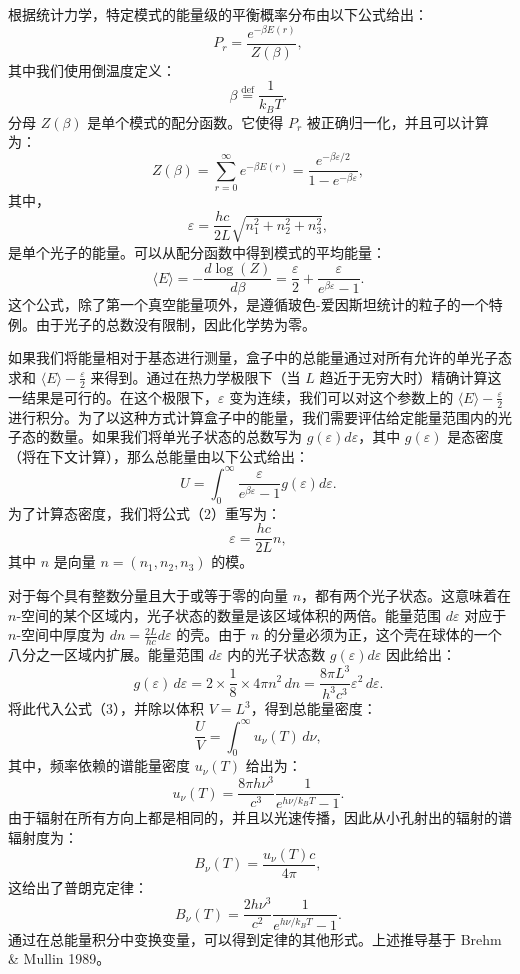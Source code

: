 根据统计力学，特定模式的能量级的平衡概率分布由以下公式给出：
\[
P_r = \frac{e^{-\beta E(r)}}{Z(\beta)},~
\]
其中我们使用倒温度定义：
\[
\beta \stackrel{\mathrm{def}}{=} \frac{1}{k_B T}.~
\]
分母 \( Z(\beta) \) 是单个模式的配分函数。它使得 \( P_r \) 被正确归一化，并且可以计算为：
\[
Z(\beta) = \sum_{r=0}^{\infty} e^{-\beta E(r)} = \frac{e^{-\beta \varepsilon / 2}}{1 - e^{-\beta \varepsilon}},~
\]
其中，
\[
\varepsilon = \frac{hc}{2L} \sqrt{n_1^2 + n_2^2 + n_3^2},~
\]
是单个光子的能量。可以从配分函数中得到模式的平均能量：
\[
\langle E \rangle = -\frac{d \log (Z)}{d \beta} = \frac{\varepsilon}{2} + \frac{\varepsilon}{e^{\beta \varepsilon} - 1}.~
\]
这个公式，除了第一个真空能量项外，是遵循玻色-爱因斯坦统计的粒子的一个特例。由于光子的总数没有限制，因此化学势为零。

如果我们将能量相对于基态进行测量，盒子中的总能量通过对所有允许的单光子态求和 \( \langle E \rangle - \frac{\varepsilon}{2} \) 来得到。通过在热力学极限下（当 \( L \) 趋近于无穷大时）精确计算这一结果是可行的。在这个极限下，\( \varepsilon \) 变为连续，我们可以对这个参数上的 \( \langle E \rangle - \frac{\varepsilon}{2} \) 进行积分。为了以这种方式计算盒子中的能量，我们需要评估给定能量范围内的光子态的数量。如果我们将单光子状态的总数写为 \( g(\varepsilon) d\varepsilon \)，其中 \( g(\varepsilon) \) 是态密度（将在下文计算），那么总能量由以下公式给出：
\[
U = \int_0^\infty \frac{\varepsilon}{e^{\beta \varepsilon} - 1} g(\varepsilon) d\varepsilon.~
\]
为了计算态密度，我们将公式（2）重写为：
\[
\varepsilon = \frac{hc}{2L} n,~
\]
其中 \( n \) 是向量 \( n = (n_1, n_2, n_3) \) 的模。

对于每个具有整数分量且大于或等于零的向量 \( n \)，都有两个光子状态。这意味着在 \( n \)-空间的某个区域内，光子状态的数量是该区域体积的两倍。能量范围 \( d\varepsilon \) 对应于 \( n \)-空间中厚度为 \( dn = \frac{2L}{hc} d\varepsilon \) 的壳。由于 \( n \) 的分量必须为正，这个壳在球体的一个八分之一区域内扩展。能量范围 \( d\varepsilon \) 内的光子状态数 \( g(\varepsilon) d\varepsilon \) 因此给出：
\[
g(\varepsilon)\,d\varepsilon = 2 \times \frac{1}{8} \times 4\pi n^2\,dn = \frac{8\pi L^3}{h^3 c^3} \varepsilon^2\,d\varepsilon.~
\]
将此代入公式（3），并除以体积 \( V = L^3 \)，得到总能量密度：
\[
\frac{U}{V} = \int_0^\infty u_{\nu}(T)\,d\nu,~
\]
其中，频率依赖的谱能量密度 \( u_{\nu}(T) \) 给出为：
\[
u_{\nu}(T) = \frac{8\pi h \nu^3}{c^3} \frac{1}{e^{h\nu / k_B T} - 1}.~
\]
由于辐射在所有方向上都是相同的，并且以光速传播，因此从小孔射出的辐射的谱辐射度为：
\[
B_{\nu}(T) = \frac{u_{\nu}(T) c}{4\pi},~
\]
这给出了普朗克定律：
\[
B_{\nu}(T) = \frac{2h \nu^3}{c^2} \frac{1}{e^{h\nu / k_B T} - 1}.~
\]
通过在总能量积分中变换变量，可以得到定律的其他形式。上述推导基于 Brehm & Mullin 1989。
